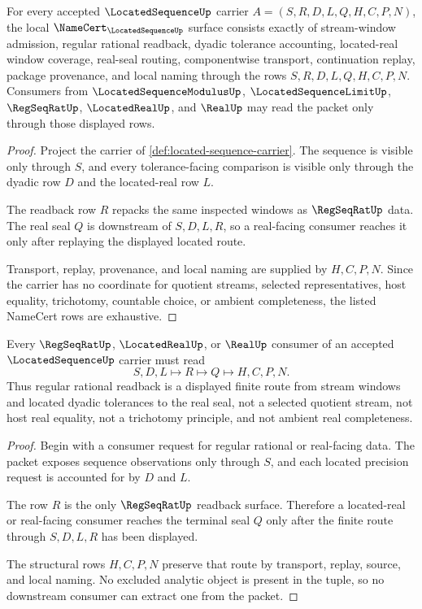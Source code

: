 \begin{theorem}
\label{thm:located-sequence-namecert-obligations}
For every accepted $\LocatedSequenceUp$ carrier $A=(S,R,D,L,Q,H,C,P,N)$, the local $\NameCert_{\LocatedSequenceUp}$ surface consists exactly of stream-window admission, regular rational readback, dyadic tolerance accounting, located-real window coverage, real-seal routing, componentwise transport, continuation replay, package provenance, and local naming through the rows $S,R,D,L,Q,H,C,P,N$. Consumers from $\LocatedSequenceModulusUp$, $\LocatedSequenceLimitUp$, $\RegSeqRatUp$, $\LocatedRealUp$, and $\RealUp$ may read the packet only through those displayed rows.
\end{theorem}
\begin{proof}
Project the carrier of \autoref{def:located-sequence-carrier}. The sequence is visible only through $S$, and every tolerance-facing comparison is visible only through the dyadic row $D$ and the located-real row $L$.

The readback row $R$ repacks the same inspected windows as $\RegSeqRatUp$ data. The real seal $Q$ is downstream of $S,D,L,R$, so a real-facing consumer reaches it only after replaying the displayed located route.

Transport, replay, provenance, and local naming are supplied by $H,C,P,N$. Since the carrier has no coordinate for quotient streams, selected representatives, host equality, trichotomy, countable choice, or ambient completeness, the listed NameCert rows are exhaustive.
\end{proof}

\begin{theorem}
\label{thm:located-sequence-regseqrat-readback}
Every $\RegSeqRatUp$, $\LocatedRealUp$, or $\RealUp$ consumer of an accepted $\LocatedSequenceUp$ carrier must read
$$
S,D,L \longmapsto R \longmapsto Q \longmapsto H,C,P,N .
$$
Thus regular rational readback is a displayed finite route from stream windows and located dyadic tolerances to the real seal, not a selected quotient stream, not host real equality, not a trichotomy principle, and not ambient real completeness.
\end{theorem}
\begin{proof}
Begin with a consumer request for regular rational or real-facing data. The packet exposes sequence observations only through $S$, and each located precision request is accounted for by $D$ and $L$.

The row $R$ is the only $\RegSeqRatUp$ readback surface. Therefore a located-real or real-facing consumer reaches the terminal seal $Q$ only after the finite route through $S,D,L,R$ has been displayed.

The structural rows $H,C,P,N$ preserve that route by transport, replay, source, and local naming. No excluded analytic object is present in the tuple, so no downstream consumer can extract one from the packet.
\end{proof}

